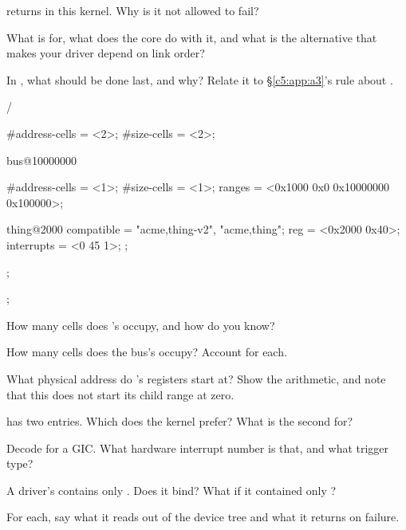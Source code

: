   returns  in this kernel. Why is it not allowed to fail?

 What is  for, what does the core do with it, and what is the
alternative that makes your driver depend on link order?

 In , what should be done last, and why? Relate it to \S\ref{c5:app:a3}'s rule
about .

\label{c10:ex:3}

\begin{console}
/ {
        #address-cells = <2>;
        #size-cells = <2>;

        bus@10000000 {
                #address-cells = <1>;
                #size-cells = <1>;
                ranges = <0x1000 0x0 0x10000000 0x100000>;

                thing@2000 {
                        compatible = "acme,thing-v2", "acme,thing";
                        reg = <0x2000 0x40>;
                        interrupts = <0 45 1>;
                };
        };
};
\end{console}

 How many cells does 's  occupy, and how do you know?

 How many cells does the bus's  occupy? Account for each.

 What physical address do 's registers start at? Show the arithmetic, and note
that this  does not start its child range at zero.

  has two entries. Which does the kernel prefer? What is the second for?

 Decode  for a GIC. What hardware interrupt number is that, and
what trigger type?

 A driver's  contains only . Does it bind? What if
it contained only ?

\label{c10:ex:4}

For each, say what it reads out of the device tree and what it returns on failure.

